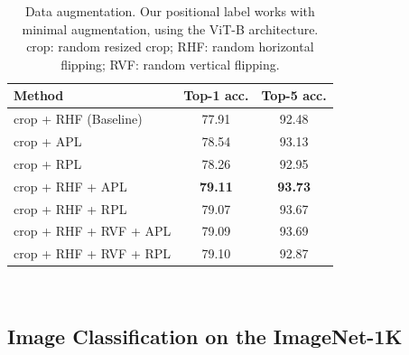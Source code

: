 \documentclass{article}
\begin{document}
\begin{table}[h]
   \centering
   \caption{Data augmentation. Our positional label works with minimal augmentation, using the ViT-B architecture. crop: random resized crop; RHF: random horizontal ﬂipping; RVF: random vertical ﬂipping.}
   \begin{tabular}{l|c|c}
      \hline %
      Method                   & Top-1 acc.      & Top-5 acc.      \\
      \hline %
      crop + RHF (Baseline)      & 77.91     &92.48      \\
      crop + APL   &   78.54  & 93.13 \\
      crop + RPL   &   78.26  & 92.95 \\
      crop + RHF + APL   &   \textbf{79.11}  & \textbf{93.73} \\
      crop + RHF + RPL   &   79.07  &93.67\\
      crop + RHF + RVF + APL   &   79.09  &93.69\\
      crop + RHF + RVF + RPL   &   79.10  &92.87\\
      \hline %
   \end{tabular} \\
   \label{ViT-B-ImageAugmentation}
\end{table}

\subsection{Image Classiﬁcation on the ImageNet-1K}
\end{document}
